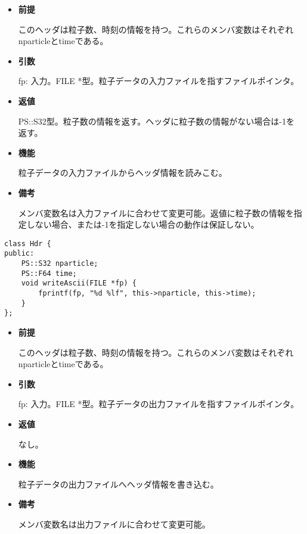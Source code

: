 \begin{itemize}

\item {\bf 前提}

  このヘッダは粒子数、時刻の情報を持つ。これらのメンバ変数はそれぞれ
  nparticleとtimeである。

\item {\bf 引数}

  fp: 入力。FILE *型。粒子データの入力ファイルを指すファイルポインタ。
  
\item {\bf 返値}

  PS::S32型。粒子数の情報を返す。ヘッダに粒子数の情報がない場合は-1を
  返す。
  
\item {\bf 機能}

  粒子データの入力ファイルからヘッダ情報を読みこむ。
  
\item {\bf 備考}

  メンバ変数名は入力ファイルに合わせて変更可能。返値に粒子数の情報を指
  定しない場合、または-1を指定しない場合の動作は保証しない。
  
\end{itemize}


\begin{screen}
\begin{verbatim}
class Hdr {
public:
    PS::S32 nparticle;
    PS::F64 time;
    void writeAscii(FILE *fp) {
        fprintf(fp, "%d %lf", this->nparticle, this->time);
    }
};
\end{verbatim}
\end{screen}

\begin{itemize}

\item {\bf 前提}

  このヘッダは粒子数、時刻の情報を持つ。これらのメンバ変数はそれぞれ
  nparticleとtimeである。

\item {\bf 引数}

  fp: 入力。FILE *型。粒子データの出力ファイルを指すファイルポインタ。
  
\item {\bf 返値}

  なし。
  
\item {\bf 機能}

  粒子データの出力ファイルへヘッダ情報を書き込む。
  
\item {\bf 備考}

  メンバ変数名は出力ファイルに合わせて変更可能。
  
\end{itemize}


